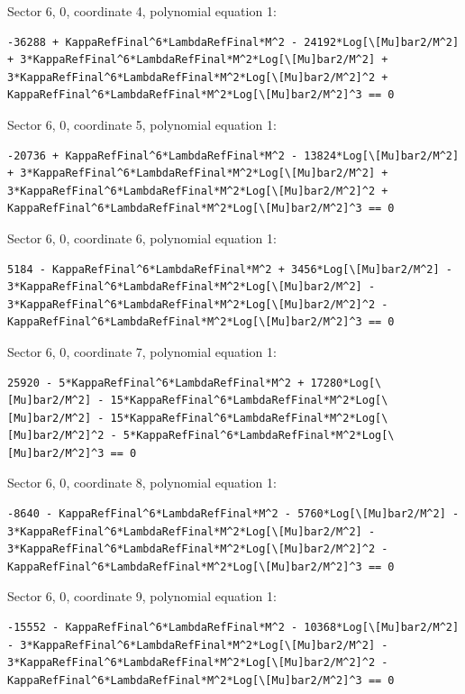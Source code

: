 \documentclass[11pt]{article}
\begin{document}
Sector {6, 0}, coordinate 4, polynomial equation 1:
\begin{verbatim}
-36288 + KappaRefFinal^6*LambdaRefFinal*M^2 - 24192*Log[\[Mu]bar2/M^2] + 3*KappaRefFinal^6*LambdaRefFinal*M^2*Log[\[Mu]bar2/M^2] + 3*KappaRefFinal^6*LambdaRefFinal*M^2*Log[\[Mu]bar2/M^2]^2 + KappaRefFinal^6*LambdaRefFinal*M^2*Log[\[Mu]bar2/M^2]^3 == 0
\end{verbatim}

Sector {6, 0}, coordinate 5, polynomial equation 1:
\begin{verbatim}
-20736 + KappaRefFinal^6*LambdaRefFinal*M^2 - 13824*Log[\[Mu]bar2/M^2] + 3*KappaRefFinal^6*LambdaRefFinal*M^2*Log[\[Mu]bar2/M^2] + 3*KappaRefFinal^6*LambdaRefFinal*M^2*Log[\[Mu]bar2/M^2]^2 + KappaRefFinal^6*LambdaRefFinal*M^2*Log[\[Mu]bar2/M^2]^3 == 0
\end{verbatim}

Sector {6, 0}, coordinate 6, polynomial equation 1:
\begin{verbatim}
5184 - KappaRefFinal^6*LambdaRefFinal*M^2 + 3456*Log[\[Mu]bar2/M^2] - 3*KappaRefFinal^6*LambdaRefFinal*M^2*Log[\[Mu]bar2/M^2] - 3*KappaRefFinal^6*LambdaRefFinal*M^2*Log[\[Mu]bar2/M^2]^2 - KappaRefFinal^6*LambdaRefFinal*M^2*Log[\[Mu]bar2/M^2]^3 == 0
\end{verbatim}

Sector {6, 0}, coordinate 7, polynomial equation 1:
\begin{verbatim}
25920 - 5*KappaRefFinal^6*LambdaRefFinal*M^2 + 17280*Log[\[Mu]bar2/M^2] - 15*KappaRefFinal^6*LambdaRefFinal*M^2*Log[\[Mu]bar2/M^2] - 15*KappaRefFinal^6*LambdaRefFinal*M^2*Log[\[Mu]bar2/M^2]^2 - 5*KappaRefFinal^6*LambdaRefFinal*M^2*Log[\[Mu]bar2/M^2]^3 == 0
\end{verbatim}

Sector {6, 0}, coordinate 8, polynomial equation 1:
\begin{verbatim}
-8640 - KappaRefFinal^6*LambdaRefFinal*M^2 - 5760*Log[\[Mu]bar2/M^2] - 3*KappaRefFinal^6*LambdaRefFinal*M^2*Log[\[Mu]bar2/M^2] - 3*KappaRefFinal^6*LambdaRefFinal*M^2*Log[\[Mu]bar2/M^2]^2 - KappaRefFinal^6*LambdaRefFinal*M^2*Log[\[Mu]bar2/M^2]^3 == 0
\end{verbatim}

Sector {6, 0}, coordinate 9, polynomial equation 1:
\begin{verbatim}
-15552 - KappaRefFinal^6*LambdaRefFinal*M^2 - 10368*Log[\[Mu]bar2/M^2] - 3*KappaRefFinal^6*LambdaRefFinal*M^2*Log[\[Mu]bar2/M^2] - 3*KappaRefFinal^6*LambdaRefFinal*M^2*Log[\[Mu]bar2/M^2]^2 - KappaRefFinal^6*LambdaRefFinal*M^2*Log[\[Mu]bar2/M^2]^3 == 0
\end{verbatim}
\end{document}
